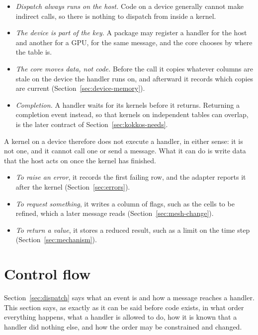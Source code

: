 \documentclass[11pt,a4paper]{article}
\begin{document}
\begin{itemize}
  \item \emph{Dispatch always runs on the host.}  Code on a device generally
        cannot make indirect calls, so there is nothing to dispatch from
        inside a kernel.
  \item \emph{The device is part of the key.}  A package may register a
        handler for the host and another for a GPU, for the same message,
        and the core chooses by where the table is.
  \item \emph{The core moves data, not code.}  Before the call it copies
        whatever columns are stale on the device the handler runs on, and
        afterward it records which copies are current
        (Section~\ref{sec:device-memory}).
  \item \emph{Completion.}  A handler waits for its kernels before it
        returns.  Returning a completion event instead, so that kernels on
        independent tables can overlap, is the later contract of
        Section~\ref{sec:kokkos-needs}.
\end{itemize}

A kernel on a device therefore does not execute a handler, in either
sense: it is not one, and it cannot call one or send a message.  What it
can do is write data that the host acts on once the kernel has finished.

\begin{itemize}
  \item \emph{To raise an error}, it records the first failing row, and the
        adapter reports it after the kernel (Section~\ref{sec:errors}).
  \item \emph{To request something}, it writes a column of flags, such as
        the cells to be refined, which a later message reads
        (Section~\ref{sec:mesh-change}).
  \item \emph{To return a value}, it stores a reduced result, such as a
        limit on the time step (Section~\ref{sec:mechanism}).
\end{itemize}

\section{Control flow}
\label{sec:control-flow}

Section~\ref{sec:dispatch} says what an event is and how a message reaches a
handler.  This section says, as exactly as it can be said before code
exists, in what order everything happens, what a handler is allowed to do,
how it is known that a handler did nothing else, and how the order may be
constrained and changed.
\end{document}
